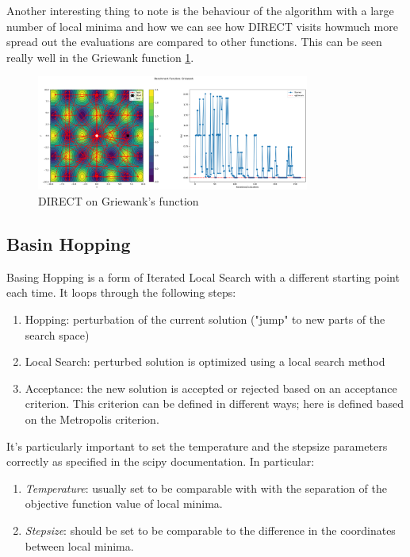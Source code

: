 Another interesting thing to note is the behaviour of the algorithm with a large number of local minima and how we can see how DIRECT visits howmuch more spread out the evaluations are compared to other functions. This can be seen really well in the Griewank function \ref{fig:griewank}.
\begin{figure}[H]
    \centering
    \includegraphics[width=0.8\textwidth]{lab2/imgs/griewank.png}
    \caption{DIRECT on Griewank's function}
    \label{fig:griewank}
\end{figure}

\subsection{Basin Hopping}
Basing Hopping is a form of Iterated Local Search with a different starting point each time. It loops through the following steps:
\begin{enumerate}
    \item Hopping: perturbation of the current solution ("jump" to new parts of the search space)
    \item Local Search: perturbed solution is optimized using a local search method
    \item Acceptance: the new solution is accepted or rejected based on an acceptance criterion. This criterion can be defined in different ways; here is defined based on the Metropolis criterion.
\end{enumerate}
It's particularly important to set the temperature and the stepsize parameters correctly as specified in the scipy documentation. In particular:
\begin{enumerate}
    \item \textit{Temperature}: usually set to be comparable with with the separation of the objective function value of local minima.
    \item \textit{Stepsize}: should be set to be comparable to the difference in the coordinates between local minima.
\end{enumerate}


